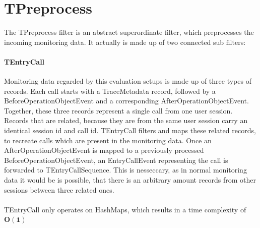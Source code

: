 \documentclass[10pt,a4paper]{article}
\begin{document}
\section{TPreprocess}
The TPreprocess filter is an abstract superordinate filter, which preprocesses the incoming monitoring data. It actually is made up of two connected sub filters:

\paragraph{TEntryCall}
Monitoring data regarded by this evaluation setups is made up of three types of records. Each call starts with a TraceMetadata record, followed by a BeforeOperationObjectEvent and a corresponding AfterOperationObjectEvent. Together, these three records represent a single call from one user session. Records that are related, because they are from the same user session carry an identical session id and call id. TEntryCall filters and maps these related records, to recreate calls which are present in the monitoring data. Once an AfterOperationObjectEvent is mapped to a previously processed BeforeOperationObjectEvent, an EntryCallEvent representing the call is forwarded to TEntryCallSequence. This is nesseccary, as in normal monitoring data it would be is possible, that there is an arbitrary amount records from other sessions between three related ones.\\
\\
TEntryCall only operates on HashMaps, which results in a time complexity of $\mathbf{O(1)}$
\end{document}
